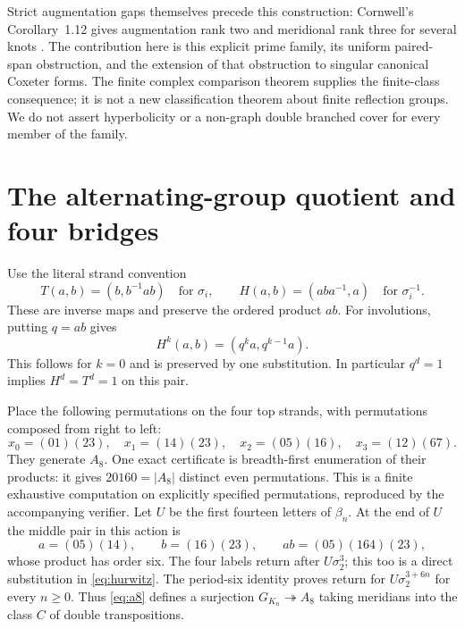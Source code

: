 \documentclass[11pt]{article}
\begin{document}
Strict augmentation gaps themselves precede this construction:
Cornwell's Corollary~1.12 gives augmentation rank two and meridional rank
three for several knots \cite{cornwell}. The contribution here is this
explicit prime family, its uniform paired-span obstruction, and the
extension of that obstruction to singular canonical Coxeter forms.
The finite complex comparison theorem \cite[Theorem
\texttt{thm:domination}]{domination} supplies the finite-class consequence;
it is not a new classification theorem about finite reflection groups.
We do not assert hyperbolicity or a non-graph double branched cover for
every member of the family.

\section{The alternating-group quotient and four bridges}

Use the literal strand convention
\begin{equation}\label{eq:hurwitz}
 T(a,b)=(b,b^{-1}ab)\quad\text{for }\sigma_i,
 \qquad H(a,b)=(aba^{-1},a)\quad\text{for }\sigma_i^{-1}.
\end{equation}
These are inverse maps and preserve the ordered product $ab$.
For involutions, putting $q=ab$ gives
\[
 H^k(a,b)=(q^ka,q^{k-1}a).
\]
This follows for $k=0$ and is preserved by one substitution. In
particular $q^d=1$ implies $H^d=T^d=1$ on this pair.

Place the following permutations on the four top strands, with
permutations composed from right to left:
\begin{equation}\label{eq:a8}
 x_0=(01)(23),\quad x_1=(14)(23),\quad
 x_2=(05)(16),\quad x_3=(12)(67).
\end{equation}
They generate $A_8$. One exact certificate is breadth-first enumeration
of their products: it gives $20160=|A_8|$ distinct even permutations.
This is a finite exhaustive computation on explicitly specified
permutations, reproduced by the accompanying verifier.
Let $U$ be the first fourteen letters of $\beta_n$. At the end of $U$
the middle pair in this action is
\[
 a=(05)(14),\qquad b=(16)(23),\qquad
 ab=(05)(164)(23),
\]
whose product has order six. The four labels return after $U\sigma_2^3$;
this too is a direct substitution in \eqref{eq:hurwitz}.
The period-six identity proves return for $U\sigma_2^{3+6n}$ for every
$n\ge0$. Thus \eqref{eq:a8} defines a surjection
$G_{K_n}\twoheadrightarrow A_8$ taking meridians into the class $C$
of double transpositions.
\end{document}

